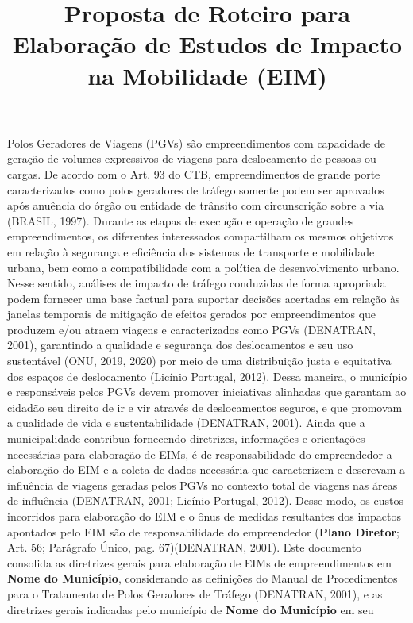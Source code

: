\documentclass[]{article}
\title{Proposta de Roteiro para Elaboração de Estudos de Impacto na Mobilidade
(EIM)}
\author{}
\date{\vspace{-2.5em}}
\begin{document}
\maketitle

{
\setcounter{tocdepth}{2}
\tableofcontents
}
Polos Geradores de Viagens (PGVs) são empreendimentos com capacidade de
geração de volumes expressivos de viagens para deslocamento de pessoas
ou cargas. De acordo com o Art. 93 do CTB, empreendimentos de grande
porte caracterizados como polos geradores de tráfego somente podem ser
aprovados após anuência do órgão ou entidade de trânsito com
circunscrição sobre a via (BRASIL, 1997). Durante as etapas de execução
e operação de grandes empreendimentos, os diferentes interessados
compartilham os mesmos objetivos em relação à segurança e eficiência dos
sistemas de transporte e mobilidade urbana, bem como a compatibilidade
com a política de desenvolvimento urbano. Nesse sentido, análises de
impacto de tráfego conduzidas de forma apropriada podem fornecer uma
base factual para suportar decisões acertadas em relação às janelas
temporais de mitigação de efeitos gerados por empreendimentos que
produzem e/ou atraem viagens e caracterizados como PGVs (DENATRAN,
2001), garantindo a qualidade e segurança dos deslocamentos e seu uso
sustentável (ONU, 2019, 2020) por meio de uma distribuição justa e
equitativa dos espaços de deslocamento (Licínio Portugal, 2012). Dessa
maneira, o município e responsáveis pelos PGVs devem promover
iniciativas alinhadas que garantam ao cidadão seu direito de ir e vir
através de deslocamentos seguros, e que promovam a qualidade de vida e
sustentabilidade (DENATRAN, 2001). Ainda que a municipalidade contribua
fornecendo diretrizes, informações e orientações necessárias para
elaboração de EIMs, é de responsabilidade do empreendedor a elaboração
do EIM e a coleta de dados necessária que caracterizem e descrevam a
influência de viagens geradas pelos PGVs no contexto total de viagens
nas áreas de influência (DENATRAN, 2001; Licínio Portugal, 2012). Desse
modo, os custos incorridos para elaboração do EIM e o ônus de medidas
resultantes dos impactos apontados pelo EIM são de responsabilidade do
empreendedor (\textbf{Plano Diretor}; Art. 56; Parágrafo Único, pag.
67)(DENATRAN, 2001). Este documento consolida as diretrizes gerais para
elaboração de EIMs de empreendimentos em \textbf{Nome do Município},
considerando as definições do Manual de Procedimentos para o Tratamento
de Polos Geradores de Tráfego (DENATRAN, 2001), e as diretrizes gerais
indicadas pelo município de \textbf{Nome do Município} em seu
\end{document}
